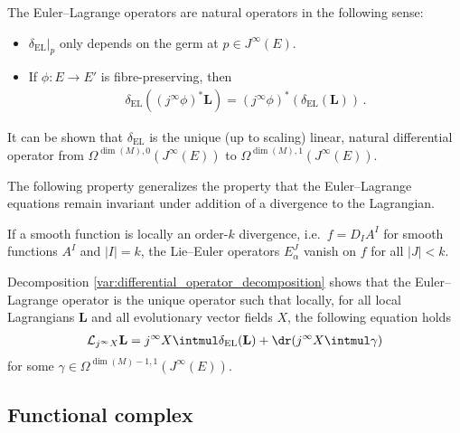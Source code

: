     \begin{property}[Naturality]
        The Euler--Lagrange operators are natural operators in the following sense:
        \begin{itemize}
            \item $\delta_{\text{EL}}|_p$ only depends on the germ at $p\in J^\infty(E)$.
            \item If $\phi:E\rightarrow E'$ is fibre-preserving, then
                \begin{gather}
                    \label{var:naturality}
                    \delta_{\text{EL}}((j^\infty\phi)^*\mathbf{L}) = (j^\infty\phi)^*(\delta_{\text{EL}}(\mathbf{L}))\,.
                \end{gather}
        \end{itemize}
        It can be shown that $\delta_{\text{EL}}$ is the unique (up to scaling) linear, natural differential operator from $\Omega^{\dim(M),0}(J^\infty(E))$ to $\Omega^{\dim(M),1}(J^\infty(E))$.
    \end{property}

    The following property generalizes the property that the Euler--Lagrange equations remain invariant under addition of a divergence to the Lagrangian.
    \begin{property}[Divergences]\label{var:EL_operator_divergences}
        If a smooth function is locally an order-$k$ divergence, i.e.~$f=D_IA^I$ for smooth functions $A^I$ and $|I|=k$, the Lie--Euler operators $E^J_\alpha$ vanish on $f$ for all $|J|<k$.
    \end{property}

    \begin{property}\label{var:local_variational_formula}
        Decomposition \ref{var:differential_operator_decomposition} shows that the Euler--Lagrange operator is the unique operator such that locally, for all local Lagrangians $\mathbf{L}$ and all evolutionary vector fields $X$, the following equation holds
        \begin{gather}
            \mathcal{L}_{j^\infty X}\mathbf{L} = j^\infty X\intmul\delta_\mathrm{EL}(\mathbf{L}) + \dr(j^\infty X\intmul\gamma)
        \end{gather}
        for some $\gamma\in\Omega^{\dim(M)-1,1}(J^\infty(E))$.
    \end{property}

\subsection{Functional complex}

